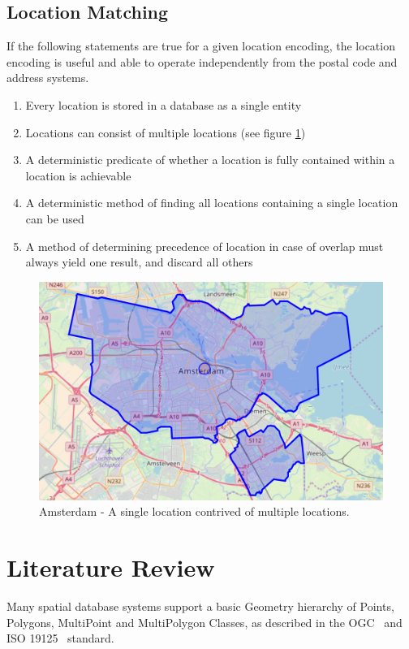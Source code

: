 \subsection{Location Matching}
If the following statements are true for a given location encoding, the location encoding is useful and able to operate independently from the postal code and address systems.

\begin{enumerate}
	\item Every location is stored in a database as a single entity
	\item Locations can consist of multiple locations (see figure \ref{fig:Amsterdam})
	\item A deterministic predicate of whether a location is fully contained within a location is achievable
	\item A deterministic method of finding all locations containing a single location can be used
	\item A method of determining precedence of location in case of overlap must always yield one result, and discard all others
\end{enumerate}

\begin{figure}[htbp!]
	\centering
	\includegraphics[width=.8\textwidth]{Amsterdam}
	\caption[Amsterdam]{Amsterdam - A single location contrived of multiple locations.}
	\label{fig:Amsterdam}
\end{figure}


%
\section{Literature Review}
Many spatial database systems support a basic Geometry hierarchy of Points, Polygons, MultiPoint and MultiPolygon Classes, as described in the OGC~\cite{SFA} and ISO 19125~\cite{ISO-19125} standard.

